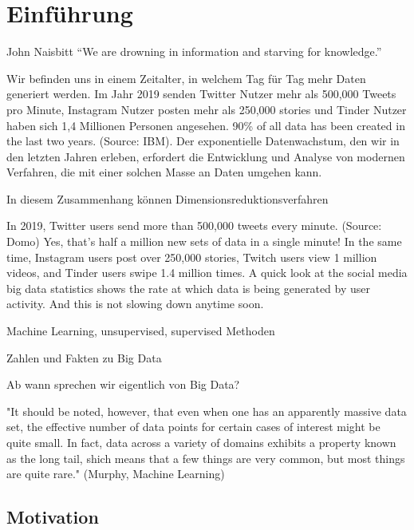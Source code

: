 \chapter{Einführung}

\label{introduction}

\begin{chapquote}{John Naisbitt}
``We are drowning in information and starving for knowledge.''
\end{chapquote}

Wir befinden uns in einem Zeitalter, in welchem Tag für Tag mehr Daten generiert werden. Im Jahr 2019 senden Twitter Nutzer mehr als 500,000 Tweets pro Minute, Instagram Nutzer posten mehr als 250,000 stories und Tinder Nutzer haben sich 1,4 Millionen Personen angesehen.
90\% of all data has been created in the last two years.
(Source: IBM). Der exponentielle Datenwachstum, den wir in den letzten Jahren erleben, erfordert die Entwicklung und Analyse von modernen Verfahren, die mit einer solchen Masse an Daten umgehen kann. 

In diesem Zusammenhang können Dimensionsreduktionsverfahren 

In 2019, Twitter users send more than 500,000 tweets every minute. (Source: Domo)
Yes, that’s half a million new sets of data in a single minute! In the same time, Instagram users post over 250,000 stories, Twitch users view 1 million videos, and Tinder users swipe 1.4 million times. A quick look at the social media big data statistics shows the rate at which data is being generated by user activity. And this is not slowing down anytime soon.



Machine Learning, unsupervised, supervised Methoden

Zahlen und Fakten zu Big Data

Ab wann sprechen wir eigentlich von Big Data?

"It should be noted, however, that even when one has an apparently massive data set, the effective number of data points for certain cases of interest might be quite small. In fact, data across a variety of domains exhibits a property known as the long tail, shich means that a few things are very common, but most things are quite rare."
(Murphy, Machine Learning)

\section{Motivation}

